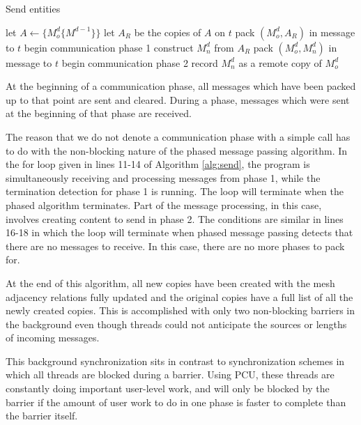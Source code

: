 \documentclass[final,1p,times]{elsarticle}
\begin{document}
\begin{algorithm}[!ht]
\caption{Send entities}
\label{alg:send}
\begin{algorithmic}[1]
      \State let $A \gets \{M_o^d\{M^{d-1}\}\}$
        \State let $A_R$ be the copies of $A$ on $t$
        \State pack $(M_o^d,A_R)$ in message to $t$
      \EndFor
    \EndFor
    \State begin communication phase 1
      \State construct $M_n^d$ from $A_R$
      \State pack $(M_o^d,M_n^d)$ in message to $t$
    \EndFor
    \State begin communication phase 2
      \State record $M_n^d$ as a remote copy of $M_o^d$
    \EndFor
  \EndFor
\EndFunction
\end{algorithmic}
\end{algorithm}

At the beginning of a communication phase, all messages which have been packed
up to that point are sent and cleared.
During a phase, messages which were sent at the beginning of that
phase are received.

The reason that we do not denote a communication phase with a simple
call has to do with the non-blocking nature of the phased message passing
algorithm.
In the for loop given in lines 11-14 of Algorithm \ref{alg:send}, the program is simultaneously
receiving and processing messages from phase 1,
while the termination detection for phase 1 is running.
The loop will terminate when the phased algorithm terminates.
Part of the message processing, in this case, involves creating 
content to send in phase 2.
The conditions are similar in lines 16-18 in which the loop will terminate
when phased message passing detects that there are no messages to receive.
In this case, there are no more phases to pack for.

At the end of this algorithm, all new copies have been created with
the mesh adjacency relations fully updated  \cite{seol06,shephard2010flexible} 
and the original copies have a full list
of all the newly created copies.
This is accomplished with only two non-blocking barriers in the background even though
threads could not anticipate the sources or lengths of incoming messages.

This background synchronization sits in contrast to synchronization
schemes in which all threads are blocked during a barrier.
Using PCU, these threads are constantly doing important user-level work,
and will only be blocked by the barrier if the amount of user work
to do in one phase is faster to complete than the barrier itself.
\end{document}
